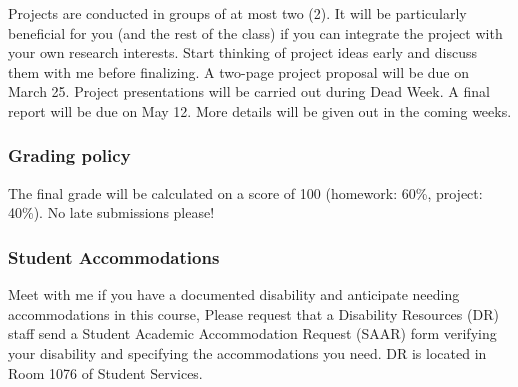\documentclass[11pt,twoside]{article}
\begin{document}
Projects are conducted in groups of at most two (2). It will be particularly 
beneficial for you (and the rest of the class) if you can integrate the project 
with your own research interests. Start thinking of project ideas early and 
discuss them with me before finalizing. A two-page project proposal will be due 
on March 25. Project presentations will be carried out during Dead Week. A 
final report will be due on May 12. More details will be given out in the 
coming weeks.

\subsubsection*{Grading policy}
The final grade will be calculated on a score of 100 (homework:  60\%, project: 
40\%). No late submissions please!

\subsubsection*{Student Accommodations}
Meet with me if you have a documented disability and anticipate needing 
accommodations in this
course,  Please request that a
Disability Resources (DR) staff send a Student Academic Accommodation 
Request
(SAAR) form verifying your disability and specifying the accommodations you
need. DR is located in Room 1076 of Student Services. 


\printbibliography
\end{document}

